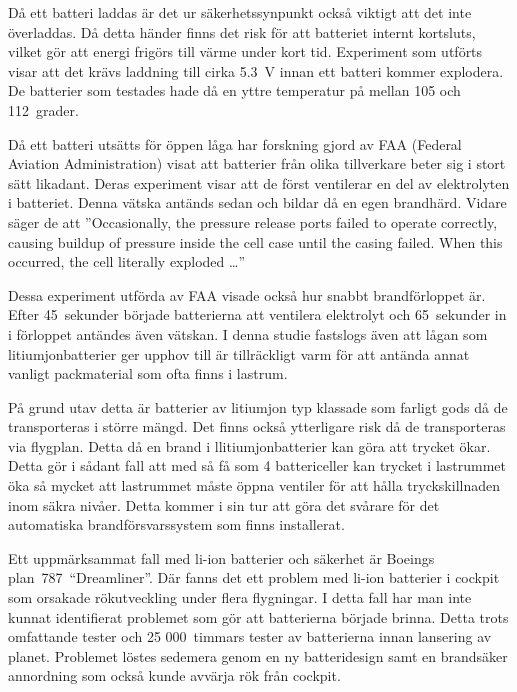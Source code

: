 \documentclass[a4paper,12pt]{article}
\begin{document}
Då ett batteri laddas är det ur säkerhetssynpunkt också viktigt att det inte överladdas. Då detta händer finns det risk för att batteriet internt kortsluts, vilket gör att energi frigörs till värme under kort tid. Experiment som utförts \cite{overcharging} visar att det krävs laddning till cirka 5.3~V innan ett batteri kommer explodera. De batterier som testades hade då en yttre temperatur på mellan 105 och 112~grader.

Då ett batteri utsätts för öppen låga har forskning gjord av FAA (Federal Aviation Administration) \cite{fire-faa} visat att batterier från olika tillverkare beter sig i stort sätt likadant. Deras experiment visar att de först ventilerar en del av elektrolyten i batteriet. Denna vätska antänds sedan och bildar då en egen brandhärd. Vidare säger de att ''Occasionally, the pressure release ports failed to operate correctly, causing buildup of pressure inside the cell case until the casing failed. When this occurred, the cell literally exploded …''

Dessa experiment utförda av FAA visade också hur snabbt brandförloppet är. Efter 45~sekunder började batterierna att ventilera elektrolyt och 65~sekunder in i förloppet antändes även vätskan. I denna studie fastslogs även att lågan som litiumjonbatterier ger upphov till är tillräckligt varm för att antända annat vanligt packmaterial som ofta finns i lastrum.\cite{fire-faa}

På grund utav detta är batterier av litiumjon typ klassade som farligt gods då de transporteras i större mängd. Det finns också ytterligare risk då de transporteras via flygplan. Detta då en brand i llitiumjonbatterier kan göra att trycket ökar. Detta gör i sådant fall att med så få som 4 battericeller kan trycket i lastrummet öka så mycket att lastrummet måste öppna ventiler för att hålla tryckskillnaden inom säkra nivåer. Detta kommer i sin tur att göra det svårare för det automatiska brandförsvarssystem som finns installerat.\cite{fire-faa}

Ett uppmärksammat fall med li-ion batterier och säkerhet är Boeings plan~787~“Dreamliner”. Där fanns det ett problem med li-ion batterier i cockpit som orsakade rökutveckling under flera flygningar. I detta fall har man inte kunnat identifierat problemet som gör att batterierna började brinna. Detta trots omfattande tester och 25 000~timmars tester av batterierna innan lansering av planet. Problemet löstes sedemera genom en ny batteridesign samt en brandsäker annordning som också kunde avvärja rök från cockpit.\cite{dreamliner}
\end{document}

